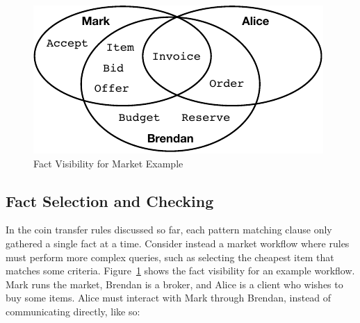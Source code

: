 \begin{figure}
\begin{center}
\includegraphics{figure/auction-visibility.pdf}
\end{center}
\vspace{-2ex}
\caption{Fact Visibility for Market Example}
\label{f:AuctionVisibility}
\end{figure}


\subsection{Fact Selection and Checking}
\label{s:Query}
\label{s:Selection}
In the coin transfer rules discussed so far, each pattern matching clause only gathered a single fact at a time. Consider instead a market workflow where rules must perform more complex queries, such as selecting the cheapest item that matches some criteria. Figure~\ref{f:AuctionVisibility} shows the fact visibility for an example workflow. Mark runs the market, Brendan is a broker, and Alice is a client who wishes to buy some items. Alice must interact with Mark through Brendan, instead of communicating directly, like so:

